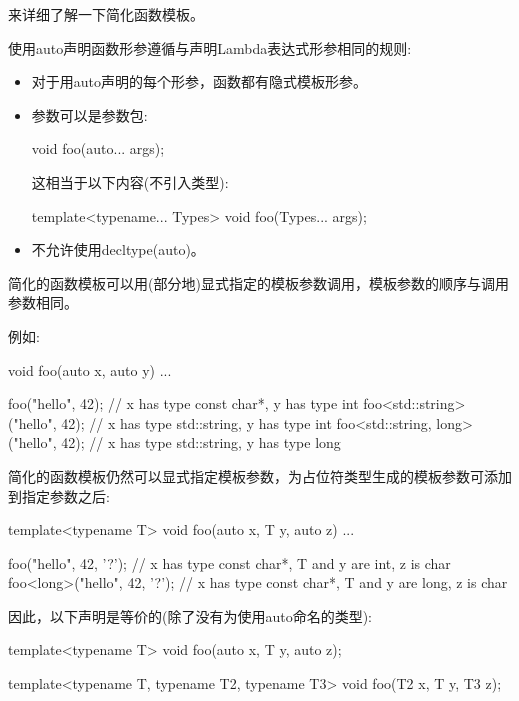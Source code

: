 
来详细了解一下简化函数模板。


使用auto声明函数形参遵循与声明Lambda表达式形参相同的规则:

\begin{itemize}
\item
对于用auto声明的每个形参，函数都有隐式模板形参。

\item
参数可以是参数包:
\begin{cpp}
void foo(auto... args);
\end{cpp}

这相当于以下内容(不引入类型):
\begin{cpp}
template<typename... Types>
void foo(Types... args);
\end{cpp}

\item
不允许使用decltype(auto)。
\end{itemize}

简化的函数模板可以用(部分地)显式指定的模板参数调用，模板参数的顺序与调用参数相同。

例如:

\begin{cpp}
void foo(auto x, auto y)
{
	...
}

foo("hello", 42); // x has type const char*, y has type int
foo<std::string>("hello", 42); // x has type std::string, y has type int
foo<std::string, long>("hello", 42); // x has type std::string, y has type long
\end{cpp}


简化的函数模板仍然可以显式指定模板参数，为占位符类型生成的模板参数可添加到指定参数之后:

\begin{cpp}
template<typename T>
void foo(auto x, T y, auto z)
{
	...
}

foo("hello", 42, '?'); // x has type const char*, T and y are int, z is char
foo<long>("hello", 42, '?'); // x has type const char*, T and y are long, z is char
\end{cpp}

因此，以下声明是等价的(除了没有为使用auto命名的类型):

\begin{cpp}
template<typename T>
void foo(auto x, T y, auto z);

template<typename T, typename T2, typename T3>
void foo(T2 x, T y, T3 z);
\end{cpp}

